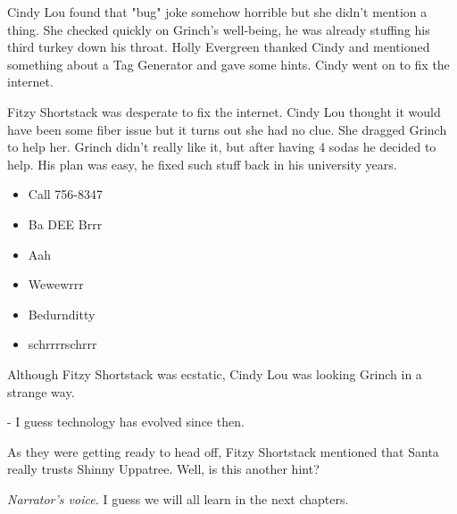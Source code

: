 Cindy Lou found that "bug" joke somehow horrible but she didn't mention a thing. She checked quickly on Grinch's well-being, he was already stuffing his third turkey down his throat.
{\color{codegreen}Holly Evergreen} thanked Cindy and mentioned something about a Tag Generator and gave some hints. Cindy went on to fix the internet.

{\color{codegreen}Fitzy Shortstack} was desperate to fix the internet. Cindy Lou thought it would have been some fiber issue but it turns out she had no clue. She dragged Grinch to help her.
Grinch didn't really like it, but after having 4 sodas he decided to help. His plan was easy, he fixed such stuff back in his university years.

\begin{itemize}
  \item Call 756-8347
  \item Ba DEE Brrr
  \item Aah
  \item Wewewrrr
  \item Bedurnditty
  \item schrrrrschrrr
\end{itemize}

Although {\color{codegreen}Fitzy Shortstack} was ecstatic, Cindy Lou was looking Grinch in a strange way.

- I guess technology has evolved since then.

As they were getting ready to head off, {\color{codegreen}Fitzy Shortstack} mentioned that Santa really trusts {\color{codegreen}Shinny Uppatree}. Well, is this another hint?

\textit{Narrator's voice.} I guess we will all learn in the next chapters.
